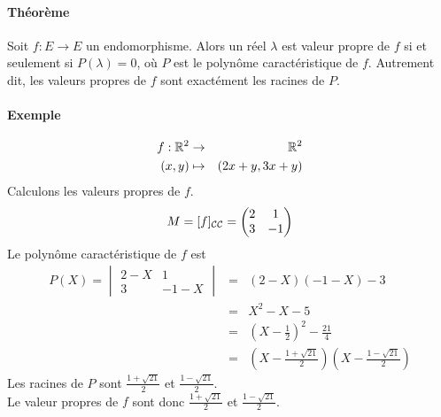 \paragraph{Théorème} Soit $f: E \rightarrow E$ un endomorphisme. Alors un réel $\lambda$ est valeur propre de $f$ si et seulement si $P(\lambda) = 0$, où $P$ est le polynôme caractéristique de $f$. Autrement dit, les valeurs propres de $f$ sont exactément les racines de $P$.


\paragraph{Exemple} 
\begin{eqnarray*}
  f: \mathbb{R}^2 &\rightarrow& \mathbb{R}^2 \\
  (x, y) &\mapsto& (2x + y, 3x+ y)
\end{eqnarray*}
Calculons les valeurs propres de $f$.
\begin{eqnarray*}
  M = [f]_{\mathcal{C} \mathcal{C}} = \begin{pmatrix} 2 & 1 \\ 3 & -1 \end{pmatrix}
\end{eqnarray*}
Le polynôme caractéristique de $f$ est
\begin{eqnarray*}
  P(X) = \begin{vmatrix} 2-X & 1 \\ 3 & -1-X \end{vmatrix} &=& (2 -X)(-1 -X) -3 \\
    &=& X^2 - X - 5 \\
    &=& \left( X-\frac{1}{2} \right)^2 - \frac{21}{4} \\
    &=& \left(X - \frac{1 + \sqrt{21}}{2} \right) \left(X - \frac{1 - \sqrt{21}}{2} \right)
\end{eqnarray*}
Les racines de $P$ sont $\frac{1 + \sqrt{21}}{2}$ et $\frac{1 - \sqrt{21}}{2}$. \\
Le valeur propres de $f$ sont donc $\frac{1 + \sqrt{21}}{2}$ et $\frac{1 - \sqrt{21}}{2}$.


